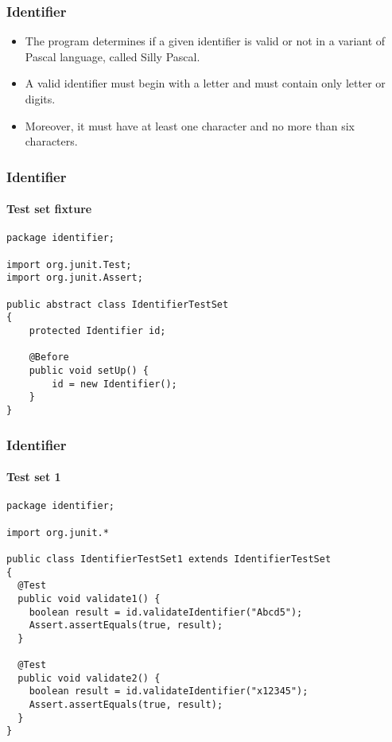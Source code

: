 \begin{frame}[hasprev=false, hasnext=false]
\frametitle{Identifier}
\label{example:identifier-testcases-junit}

\begin{itemize}
	\item The program determines if a given identifier is valid or not in a
	variant of Pascal language, called Silly Pascal.

	\item A valid identifier must begin with a letter and must contain only
	letter or digits.

	\item Moreover, it must have at least one character and no more than six
	characters.
\end{itemize}
\end{frame}



\begin{frame}[fragile, hasprev=true, hasnext=true]
\frametitle{Identifier}
\framesubtitle{Test set fixture}


\begin{lstlisting}
package identifier;

import org.junit.Test;
import org.junit.Assert;

public abstract class IdentifierTestSet
{
	protected Identifier id;

	@Before
	public void setUp() {
		id = new Identifier();
	}
}
\end{lstlisting}
\end{frame}




\begin{frame}[fragile]
\frametitle{Identifier}
\framesubtitle{Test set 1}

\begin{lstlisting}
package identifier;

import org.junit.*

public class IdentifierTestSet1 extends IdentifierTestSet
{
  @Test
  public void validate1() {
    boolean result = id.validateIdentifier("Abcd5");
    Assert.assertEquals(true, result);
  }

  @Test
  public void validate2() {
    boolean result = id.validateIdentifier("x12345");
    Assert.assertEquals(true, result);
  }
}
\end{lstlisting}
\end{frame}




